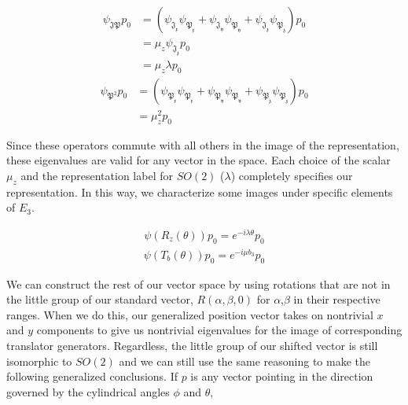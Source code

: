 \documentclass[10pt]{ucthesis}
\begin{document}
\begin{equation}
\begin{aligned}
	\psi_{\mathfrak{JP}}p_0 &= (\psi_{\mathfrak{J_x}}\psi_{\mathfrak{P_x}} + \psi_{\mathfrak{J_y}}\psi_{\mathfrak{P_y}} + \psi_{\mathfrak{J_z}}\psi_{\mathfrak{P_z}})p_0 \\
							&= \mu_z \psi_{\mathfrak{J_z}}p_0 \\
							&= \mu_z\lambda p_0
\end{aligned}
\end{equation}
\begin{equation}
\begin{aligned}
	\psi_{\mathfrak{P}^2}p_0 &= (\psi_{\mathfrak{P_x}}\psi_{\mathfrak{P_x}} + \psi_{\mathfrak{P_y}}\psi_{\mathfrak{P_y}} + \psi_{\mathfrak{P_z}}\psi_{\mathfrak{P_z}})p_0 \\
							&= \mu_z^2p_0
\end{aligned}
\end{equation}

Since these operators commute with all others in the image of the representation, these eigenvalues are valid for any vector in the space. Each choice of the scalar $\mu_z$ and the representation label for $SO(2)$ ($\lambda$) completely specifies our representation. In this way, we characterize some images under specific elements of $E_3$.

\begin{equation}
\begin{aligned}
	\psi(R_z(\theta)) p_0 = e^{-i\lambda\theta}p_0
\end{aligned}
\end{equation}
\begin{equation}
\begin{aligned}
	\psi(T_b(\theta)) p_0 = e^{-i\mu b_3}p_0
\end{aligned}
\end{equation}

We can construct the rest of our vector space by using rotations that are not in the little group of our standard vector, $R(\alpha,\beta,0)$ for $\alpha$,$\beta$ in their respective ranges. When we do this, our generalized position vector takes on nontrivial $x$ and $y$ components to give us nontrivial eigenvalues for the image of corresponding translator generators. Regardless, the little group of our shifted vector is still isomorphic to $SO(2)$ and we can still use the same reasoning to make the following generalized conclusions. If $p$ is any vector pointing in the direction governed by the cylindrical angles $\phi$ and $\theta$,
\end{document}
